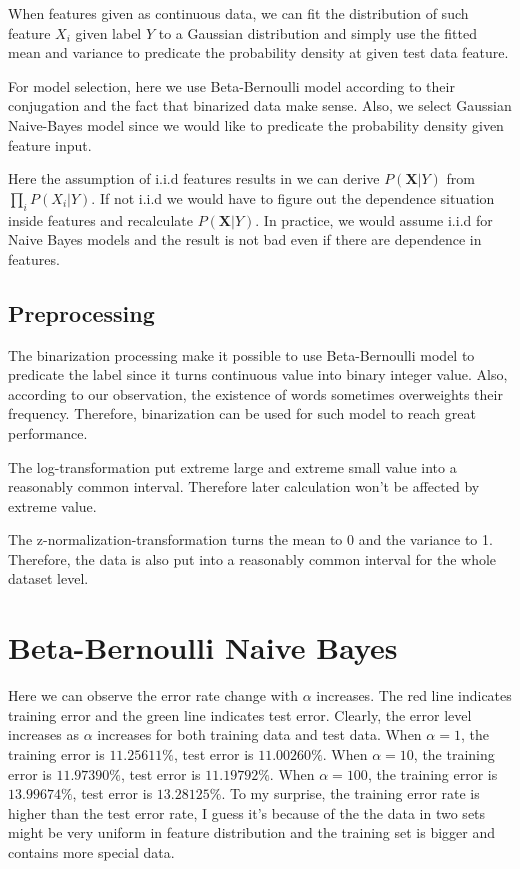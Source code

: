 \documentclass[11pt, oneside]{article}
\renewcommand{\vec}[1]{\mathbf{#1}}
\begin{document}
When features given as continuous data, we can fit the distribution of such feature $X_i$ given label $Y$ to a Gaussian distribution and simply use the fitted mean and variance to predicate the probability density at given test data feature.

For model selection, here we use Beta-Bernoulli model according to their conjugation and the fact that binarized data make sense. Also, we select Gaussian Naive-Bayes model since we would like to predicate the probability density given feature input.

Here the assumption of i.i.d features results in we can derive $P(\vec{X}|Y)$ from $\prod_i P(X_i|Y)$. If not i.i.d we would have to figure out the dependence situation inside features and recalculate $P(\vec{X}|Y)$. In practice, we would assume i.i.d for Naive Bayes models and the result is not bad even if there are dependence in features.

\subsection{Preprocessing}

The binarization processing make it possible to use Beta-Bernoulli model to predicate the label since it turns continuous value into binary integer value. Also, according to our observation, the existence of words sometimes overweights their frequency. Therefore, binarization can be used for such model to reach great performance.

The log-transformation put extreme large and extreme small value into a reasonably common interval. Therefore later calculation won't be affected by extreme value.

The z-normalization-transformation turns the mean to 0 and the variance to 1. Therefore, the data is also put into a reasonably common interval for the whole dataset level.

\section{Beta-Bernoulli Naive Bayes}
Here we can observe the error rate change with $\alpha$ increases. The red line indicates training error and the green line indicates test error. Clearly, the error level increases as $\alpha$ increases for both training data and test data. When $\alpha = 1$, the training error is $11.25611\%$, test error is $11.00260\%$. When $\alpha = 10$, the training error is $11.97390\%$, test error is $11.19792\%$. When $\alpha = 100$, the training error is $13.99674\%$, test error is $13.28125\%$. To my surprise, the training error rate is higher than the test error rate, I guess it's because of the the data in two sets might be very uniform in feature distribution and the training set is bigger and contains more special data.
\end{document}
